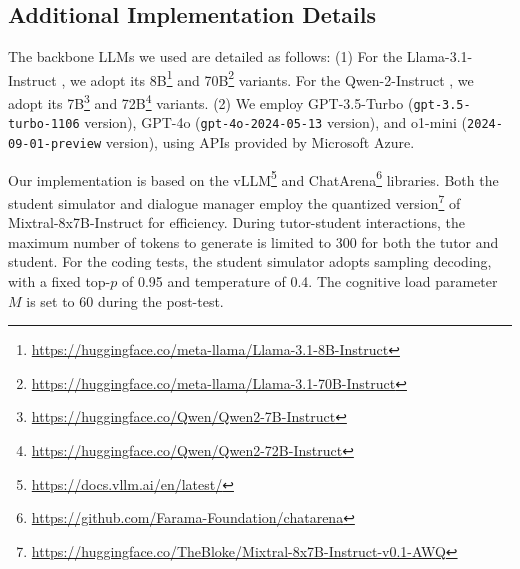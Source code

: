 \subsection{Additional Implementation Details}
\label{appendix:implementation}

The backbone LLMs we used are detailed as follows: (1) For the Llama-3.1-Instruct \cite{dubey2024llama}, we adopt its 8B\footnote{\url{https://huggingface.co/meta-llama/Llama-3.1-8B-Instruct}} and 70B\footnote{\url{https://huggingface.co/meta-llama/Llama-3.1-70B-Instruct}} variants. For the Qwen-2-Instruct \cite{yang2024qwen2}, we adopt its 7B\footnote{\url{https://huggingface.co/Qwen/Qwen2-7B-Instruct}} and 72B\footnote{\url{https://huggingface.co/Qwen/Qwen2-72B-Instruct}} variants. (2) We employ GPT-3.5-Turbo (\texttt{gpt-3.5-turbo-1106} version), GPT-4o (\texttt{gpt-4o-2024-05-13} version), and o1-mini (\texttt{2024-09-01-preview} version), using APIs provided by Microsoft Azure.


\begin{table}[t!]
\centering
{}
\caption{Statistics of the preprocessed EvoCodeBench.}
\label{tab:data_stats}
\end{table}


Our implementation is based on the vLLM\footnote{\url{https://docs.vllm.ai/en/latest/}} and ChatArena\footnote{\url{https://github.com/Farama-Foundation/chatarena}} libraries. Both the student simulator and dialogue manager employ the quantized version\footnote{\url{https://huggingface.co/TheBloke/Mixtral-8x7B-Instruct-v0.1-AWQ}} of Mixtral-8x7B-Instruct \cite{jiang2024mixtral} for efficiency.
During tutor-student interactions, the maximum number of tokens to generate is limited to 300 for both the tutor and student. For the coding tests, the student simulator adopts sampling decoding, with a fixed top-$p$ of 0.95 and temperature of 0.4. The cognitive load parameter $M$ is set to 60 during the post-test.

